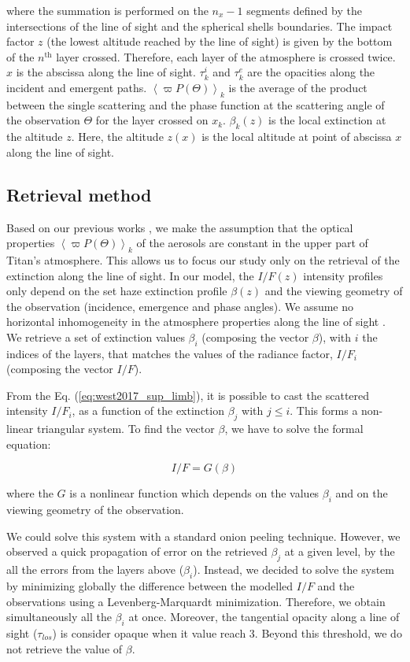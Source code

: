 where the summation is performed on the $n_x-1$ segments defined by the intersections of the line of sight and the
spherical shells boundaries. The impact factor $z$ (the lowest altitude reached by the line of sight) is given by the
bottom of the $n^\mathrm{th}$ layer crossed. Therefore, each layer of the atmosphere is crossed twice. $x$ is the
abscissa along the line of sight. $\tau^i_k$ and $\tau^e_k$ are the opacities along the incident and emergent paths.
$\left< \varpi P(\Theta)\right>_k$ is the average of the product between the single scattering and the phase function
at the scattering angle of the observation $\Theta$ for the layer crossed on $x_k$.  $\beta_k(z)$ is the local
extinction at the altitude $z$. Here, the altitude $z(x)$ is the local altitude at point of abscissa $x$ along the
line of sight.


\subsection{Retrieval method}

Based on our previous works \citep{Seignovert2017, West2018}, we make the assumption that the optical properties
$\left<\varpi P(\Theta)\right>_k$ of the aerosols are constant in the upper part of Titan's atmosphere. This allows
us to focus our study only on the retrieval of the extinction along the line of sight.
In our model, the $I/F (z)$ intensity profiles only depend on the set haze extinction profile $\beta(z)$ and the viewing
geometry of the observation (incidence, emergence and phase angles). We assume no horizontal inhomogeneity in the atmosphere
properties along the line of sight \citep{Seignovert2017}. We retrieve a set of extinction values $\beta_i$ (composing
the vector ${\beta}$), with $i$ the indices of the layers, that matches the values of the radiance factor, $I/F_i$
(composing the vector $I/F$).

From the Eq. (\ref{eq:west2017_sup_limb}), it is possible to cast the scattered intensity $I/F_i$, as a function of
the extinction $\beta_j$ with $j \le i$. This forms a non-linear triangular system. To find the vector $\beta$, we
have to solve the formal equation:

\begin{equation}
    I/F = G(\beta)
\end{equation}

where the ${G}$ is a nonlinear function which depends on the values $\beta_i$ and on the viewing geometry of the observation.

We could solve this system with a standard onion peeling technique.
However, we observed a quick propagation of error on the retrieved $\beta_j$ at a given level, by the all the errors from the
layers above ($\beta_i$).
Instead, we decided to solve the system by minimizing globally the difference between the modelled $I/F$ and the observations
using a Levenberg-Marquardt minimization. Therefore, we obtain simultaneously all the $\beta_i$ at once.
Moreover, the tangential opacity along a line of sight ($\tau_{los}$) is consider opaque when it value reach 3.
Beyond this threshold, we do not retrieve the value of $\beta$.
